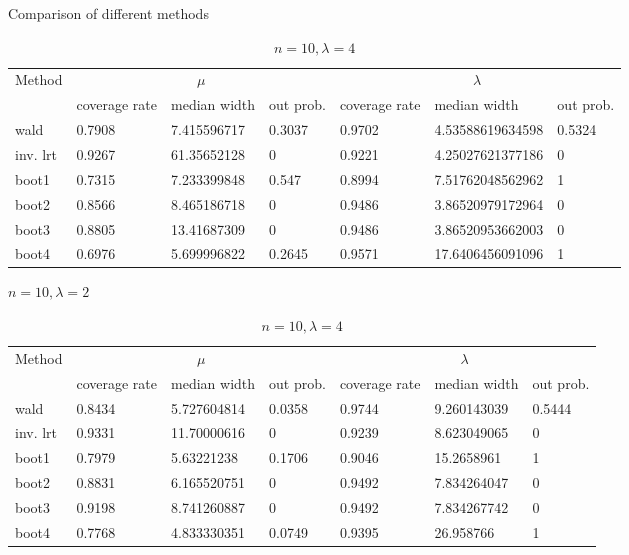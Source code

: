 \documentclass{article}
\begin{document}
    \begin{table}[!htb]
	\small
		\centering
		\caption{Comparison of different methods}
		\label{comp}
		\begin{subtable}[b]{\textwidth}
		\centering
		\begin{tabular}{l|lll|lll}
		\toprule
        \multirow{2}{*}{Method} & \multicolumn{3}{c|}{$\mu$}      & \multicolumn{3}{c}{$\lambda$}  \\ 
                           & coverage rate & median width & out prob. & coverage rate & median width & out prob. \\
                           \midrule
wald       &0.7908&	7.415596717&	0.3037               &    0.9702&4.53588619634598&0.5324\\
inv. lrt   &0.9267&	61.35652128&	0               &0.9221&4.25027621377186&0\\
boot1      &0.7315&	7.233399848&	0.547               &0.8994&7.51762048562962&1\\
boot2      &0.8566&	8.465186718&	0               &0.9486&3.86520979172964&0\\
boot3      &0.8805&	13.41687309&	0               &0.9486&3.86520953662003&0\\
boot4      &0.6976&	5.699996822&	0.2645               &0.9571&17.6406456091096&1\\
       \bottomrule
       \end{tabular}
       \caption{$n = 10, \lambda = 2$}
       \label{10_2}
       \end{subtable}%

\begin{subtable}[b]{\textwidth}
		\centering
		\begin{tabular}{l|lll|lll}
		\toprule
        \multirow{2}{*}{Method} & \multicolumn{3}{c|}{$\mu$}      & \multicolumn{3}{c}{$\lambda$}  \\ 
                           & coverage rate & median width & out prob. & coverage rate & median width & out prob. \\
                           \midrule
wald       &0.8434	&5.727604814&	0.0358&0.9744	&9.260143039&	0.5444\\    
inv. lrt   &0.9331	&11.70000616&	0     &0.9239	&8.623049065&	0\\
boot1      &0.7979	&5.63221238	&0.1706   &0.9046	&15.2658961	&1\\
boot2      &0.8831	&6.165520751&	0     &0.9492	&7.834264047&	0\\ 
boot3      &0.9198	&8.741260887&	0     &0.9492	&7.834267742&	0\\
boot4      &0.7768	&4.833330351&	0.0749&0.9395	&26.958766	&1\\
       \bottomrule
       \end{tabular}
       \caption{$n = 10, \lambda = 4$}
       \label{10_4}
       \end{subtable}%


\end{table}
\end{document}
